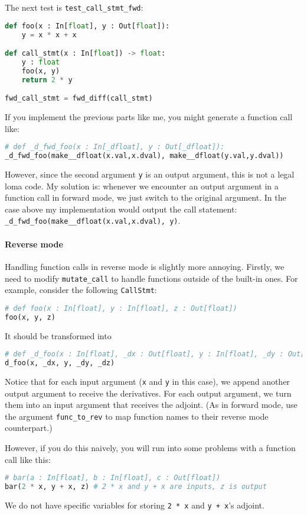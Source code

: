 The next test is \lstinline{test_call_stmt_fwd}:
\begin{lstlisting}[language=Python]
def foo(x : In[float], y : Out[float]):
    y = x * x + x

def call_stmt(x : In[float]) -> float:
    y : float
    foo(x, y)
    return 2 * y

fwd_call_stmt = fwd_diff(call_stmt)
\end{lstlisting}
If you implement the previous parts like me, you might generate a function call like:
\begin{lstlisting}[language=Python]
# def _d_fwd_foo(x : In[_dfloat], y : Out[_dfloat]):
_d_fwd_foo(make__dfloat(x.val,x.dval), make__dfloat(y.val,y.dval))
\end{lstlisting}
However, since the second argument \lstinline{y} is an output argument, this is not a legal loma code. My solution is: whenever we encounter an output argument in a function call in forward mode, we just switch to the original argument. In the case above my implementation would output the call statement: \lstinline{_d_fwd_foo(make__dfloat(x.val,x.dval), y)}.

\paragraph{Reverse mode} Handling function calls in reverse mode is slightly more annoying. Firstly, we need to modify \lstinline{mutate_call} to handle functions outside of the built-in ones. For example, consider the following \lstinline{CallStmt}:
\begin{lstlisting}[language=Python]
# def foo(x : In[float], y : In[float], z : Out[float])
foo(x, y, z)
\end{lstlisting}
It should be transformed into
\begin{lstlisting}[language=Python]
# def _d_foo(x : In[float], _dx : Out[float], y : In[float], _dy : Out[float], _dz : In[float])
d_foo(x, _dx, y, _dy, _dz)
\end{lstlisting}
Notice that for each input argument (\lstinline{x} and \lstinline{y} in this case), we append another output argument to receive the derivatives. For each output argument, we turn them into an input argument that receives the adjoint.
(As in forward mode, use the argument \lstinline{func_to_rev} to map function names to their reverse mode 
counterpart.)

However, if you do this naively, you will run into some problems with a function call like this:
\begin{lstlisting}[language=Python]
# bar(a : In[float], b : In[float], c : Out[float])
bar(2 * x, y + x, z) # 2 * x and y + x are inputs, z is output
\end{lstlisting}
We do not have specific variables for storing \lstinline{2 * x} and \lstinline{y + x}'s adjoint. 


